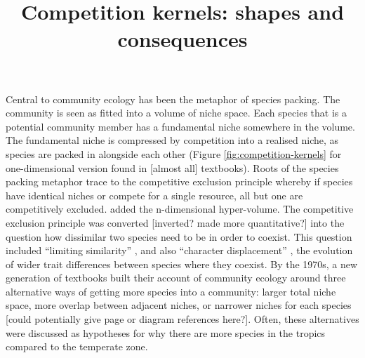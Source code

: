 \documentclass[a4paper,11pt]{article}
\title{Competition kernels: shapes and consequences}
\author{}
\date{}
\affiliation{}
\begin{document}
Central to community ecology has been the metaphor of species packing. The community is seen as fitted into a volume of niche space. Each species that is a potential community member has a fundamental niche somewhere in the volume. The fundamental niche is compressed by competition into a realised niche, as species are packed in alongside each other (Figure \ref{fig:competition-kernels} for one-dimensional version found in [almost all] textbooks). Roots of the species packing metaphor trace to the competitive exclusion principle \cite{Lotka-1925, Volterra-1926, Gause-1934} whereby if species have identical niches or compete for a single resource, all but one are competitively excluded. \citet{Hutchinson-1957} added the n-dimensional hyper-volume. The  competitive exclusion principle was converted [inverted? made more quantitative?] into the question how dissimilar two species need to be in order to coexist. This question included ``limiting similarity'' \citep{MacArthur-1967}, and also ``character displacement'' \citep{Brown-1956}, the evolution of wider trait differences between species where they coexist. By the 1970s, a new generation of textbooks \citep{Whittaker-1970,Krebs-1972,Ricklefs-1973,pianka-1974} built their account of community ecology around three alternative ways of getting more species into a community: larger total niche space, more overlap between adjacent niches, or narrower niches for each species [could potentially give page or diagram references here?]. Often, these alternatives were discussed as hypotheses for why there are more species in the tropics compared to the temperate zone.

\end{document}
